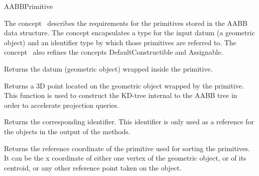 \ccRefPageBegin


\begin{ccRefConcept}{AABBPrimitive}


\ccDefinition
  
The concept \ccRefName\ describes the requirements for the primitives stored in the AABB data structure. The concept encapsulates a type for the input datum (a geometric object) and an identifier type by which those primitives are referred to. The concept \ccRefName\ also refines the concepts DefaultConstructible and Assignable.

\ccTypes







\ccOperations

{Returns the datum (geometric object) wrapped inside the primitive.}

{Returns a 3D point located on the geometric object wrapped by the primitive. This function is used to construct the KD-tree internal to the AABB tree in order to accelerate projection queries.}

{Returns the corresponding identifier. This identifier is only used as a reference for the objects in the output of the  methods.}

{Returns the  reference coordinate of the primitive used for sorting the primitives. It can be the x coordinate of either one vertex of the geometric object, or of its centroid, or any other reference point taken on the object.}


\end{ccRefConcept}

